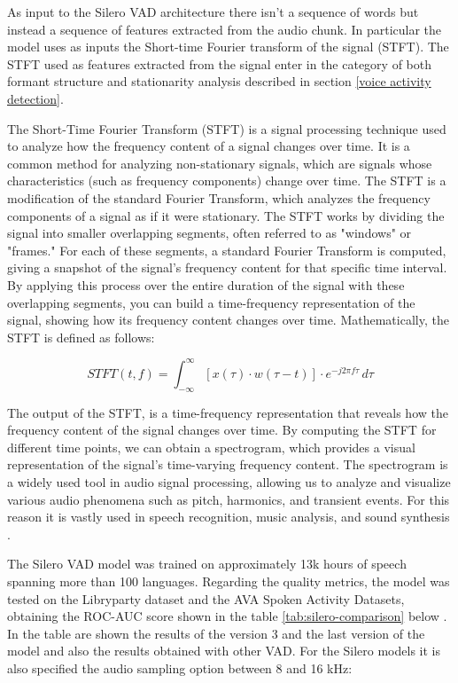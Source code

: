 \documentclass[../main.tex]{subfiles}
\begin{document}
As input to the Silero VAD architecture there isn't a sequence of words but instead a sequence of features extracted from the audio chunk. In particular the model uses as inputs the Short-time Fourier transform of the signal (STFT). The STFT used as features extracted from the signal enter in the category of both formant structure and stationarity analysis described in section \ref{voice activity detection}. 

The Short-Time Fourier Transform (STFT) is a signal processing technique used to analyze how the frequency content of a signal changes over time. It is a common method for analyzing non-stationary signals, which are signals whose characteristics (such as frequency components) change over time. The STFT is a modification of the standard Fourier Transform, which analyzes the frequency components of a signal as if it were stationary. The STFT works by dividing the signal into smaller overlapping segments, often referred to as "windows" or "frames." For each of these segments, a standard Fourier Transform is computed, giving a snapshot of the signal's frequency content for that specific time interval. By applying this process over the entire duration of the signal with these overlapping segments, you can build a time-frequency representation of the signal, showing how its frequency content changes over time. Mathematically, the STFT is defined as follows:

\[ STFT(t, f) = \int_{-\infty}^{\infty} [x(\tau) \cdot w(\tau - t)] \cdot e^{-j2\pi f\tau} \, d\tau \]

The output of the STFT, is a time-frequency representation that reveals how the frequency content of the signal changes over time. By computing the STFT for different time points, we can obtain a spectrogram, which provides a visual representation of the signal's time-varying frequency content. The spectrogram is a widely used tool in audio signal processing, allowing us to analyze and visualize various audio phenomena such as pitch, harmonics, and transient events. For this reason it is vastly used in speech recognition, music analysis, and sound synthesis \cite{stft}.

The Silero VAD model was trained on approximately 13k hours of speech spanning more than 100 languages. Regarding the quality metrics, the model was tested on the Libryparty dataset and the AVA Spoken Activity Datasets, obtaining the ROC-AUC score shown in the table \ref{tab:silero-comparison} below \cite{SileroVAD}. In the table are shown the results of the version 3 and the last version of the model and also the results obtained with other VAD. For the Silero models it is also specified the audio sampling option between 8 and 16 kHz:
\end{document}
